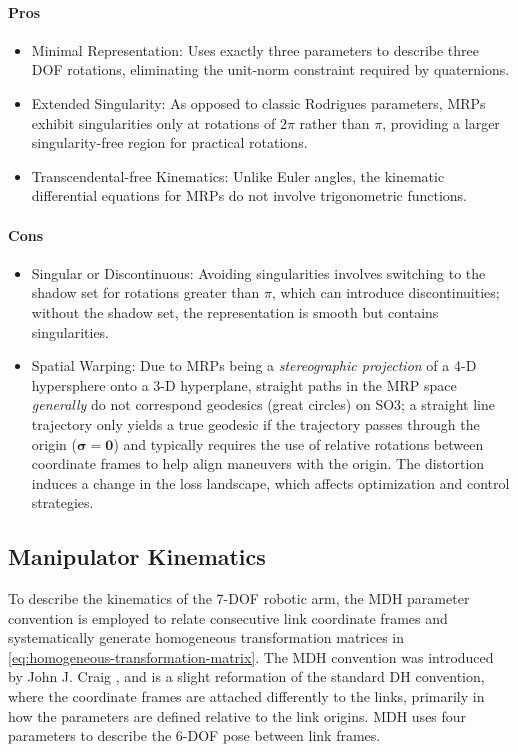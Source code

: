 \paragraph{Pros}
\begin{itemize}
    \item Minimal Representation: Uses exactly three parameters to describe three \ac{DOF} rotations, eliminating the unit-norm constraint required by quaternions.
    \item Extended Singularity: As opposed to classic Rodrigues parameters, \ac{MRP}s exhibit singularities only at rotations of $2\pi$ rather than $\pi$, providing a larger singularity-free region for practical rotations.
    \item Transcendental-free Kinematics: Unlike Euler angles, the kinematic differential equations for \ac{MRP}s do not involve trigonometric functions.
\end{itemize}

\paragraph{Cons}
\begin{itemize}
    \item Singular or Discontinuous: Avoiding singularities involves switching to the shadow set for rotations greater than $\pi$, which can introduce discontinuities; without the shadow set, the representation is smooth but contains singularities.
    \item Spatial Warping: Due to \ac{MRP}s being a \emph{stereographic projection} of a \ac{4-D} hypersphere onto a \ac{3-D} hyperplane, straight paths in the MRP space  \emph{generally} do not correspond geodesics (great circles) on \ac{SO3}; a straight line trajectory only yields a true geodesic if the trajectory passes through the origin ($\boldsymbol{\sigma}=\mathbf{0}$) and typically requires the use of relative rotations between coordinate frames to help align maneuvers with the origin. The distortion induces a change in the loss landscape, which affects optimization and control strategies.
\end{itemize}

\subsection{Manipulator Kinematics}
\label{sec:manipulator-kinematics}
To describe the kinematics of the 7-\ac{DOF} robotic arm, the \ac{MDH} parameter convention is employed to relate consecutive link coordinate frames and systematically generate homogeneous transformation matrices in \cref{eq:homogeneous-transformation-matrix}. 
The \ac{MDH} convention was introduced by John J. Craig \cite{Craig05}, and is a slight reformation of the standard \ac{DH} convention, where the coordinate frames are attached differently to the links, primarily in how the parameters are defined relative to the link origins.
\ac{MDH} uses four parameters to describe the 6-\ac{DOF} pose between link frames.

